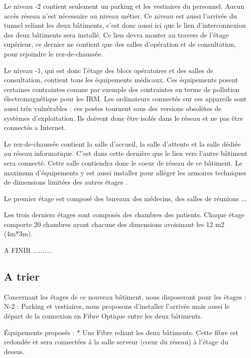 Le niveau -2 contient seulement un parking et les vestiaires du personnel.
Aucun accès réseau n'est nécessaire au niveau métier.
Ce niveau est aussi l'arrivée du tunnel reliant les deux bâtiments, c'est donc aussi ici que le lien d'interconnexion des deux bâtiments sera installé.
Ce lien devra monter au travers de l'étage supérieur, ce dernier ne contient que des salles d'opération et de consultation, pour rejoindre le rez-de-chaussée.

Le niveau -1, qui est donc l'étage des blocs opératoires et des salles de consultation, contient tous les équipements médicaux.
Ces équipements posent certaines contraintes comme par exemple des contraintes en terme de pollution électromagnétique pour les IRM.
Les ordinateurs connectés sur ces appareils sont aussi très vulnérables : ces postes tournent sous des versions obsolètes de systèmes d'exploitation.
Ils doivent donc être isolés dans le réseau et ne pas être connectés a Internet.

Le rez-de-chaussée contient la salle d'accueil, la salle d'attente et la salle dédiée au réseau informatique.
C'est dans cette dernière que le lien vers l'autre bâtiment sera connecté.
Cette salle contiendra donc le coeur de réseau de ce bâtiment.
Le maximum d'équipements y est aussi installer pour alléger les armoires techniques de dimensions limitées des autres étages .

Le premier étage est composé des bureaux des médecins, des salles de réunions ...

Les trois derniers étages sont composés des chambres des patients.
Chaque étage comporte 20 chambres ayant chacune des dimensions avoisinant les 12 m2 (4m*3m).

A FINIR ..........







\subsection{A trier}


Concernant les étages de ce nouveau bâtiment, nous disposeront pour les étages :
N-2 : Parking et vestiaires, nous proposons d’installer l’arrivée mais aussi le départ de la connexion en Fibre Optique entre les deux bâtiments.


Équipements proposés :
* Une Fibre reliant les deux bâtiments. Cette fibre est redondée et sera connectées à la salle serveur (cœur du réseau) à l’étage du dessus.


